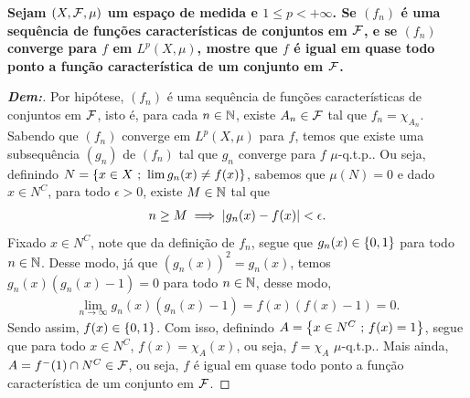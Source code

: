 \textbf{Sejam $(X, \mathcal F, \mu)$ um espaço de medida e $1 \le p < +\infty$. 
Se $(f_n)$ é uma sequência de funções características de conjuntos em $\mathcal F$, 
e se $(f_n)$ converge para $f$ em $L^p(X, \mu)$, mostre que $f$ é igual em 
quase todo ponto a função característica de um conjunto em $\mathcal F$.}
\begin{proof}[\textbf{Dem:}] Por hipótese, $(f_n)$ é uma sequência 
de funções características de conjuntos em $\mathcal F$, isto é, 
para cada $n \in \mathbb N$, existe $A_n \in \mathcal F$ tal que $f_n = \chi_{A_n}$. 
Sabendo que $(f_n)$ converge em $L^p(X, \mu)$ para $f$, temos que 
existe uma subsequência $(g_n)$ de $(f_n)$ tal que $g_n$ converge para $f$
$\mu$-q.t.p.. Ou seja, definindo $N=\left\{x \in X \text{ ; } \lim g_n(x) \neq f(x)\right\}$,
sabemos que $\mu(N) = 0$ e dado $x \in N^C$, para todo $\epsilon>0$, 
existe $M \in \mathbb N$ tal que 
\begin{align*}
  n \ge M \implies \left|g_n(x) - f(x)\right| < \epsilon.
\end{align*}
Fixado $x \in N^C$, note que da definição de $f_n$, segue que $g_n(x) \in\left\{0, 1\right\}$ 
para todo $n \in \mathbb N$. Desse modo, já que $(g_n(x))^2 = g_n(x)$, temos 
$g_n(x)(g_n(x) - 1) = 0$ para todo $n \in \mathbb N$, desse modo,
\begin{align*}
  \lim_{n \rightarrow \infty} g_n(x)(g_n(x) - 1) = f(x)(f(x) - 1) = 0.
\end{align*}
Sendo assim, $f(x) \in \left\{0, 1\right\}$. Com isso, definindo $A = \left\{x \in N^C \text{ ; } f(x) = 1\right\}$,
segue que para todo $x \in N^C$, $f(x) = \chi_A(x)$, ou seja, $f = \chi_A$ $\mu$-q.t.p..
Mais ainda, $A = f^-(1)\cap N^C \in \mathcal F$, ou seja, $f$ é igual em quase 
todo ponto a função característica de um conjunto em $\mathcal F$.
\end{proof}

